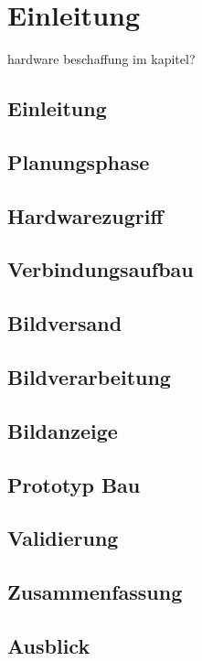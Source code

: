 \chapter{Einleitung}
hardware beschaffung im kapitel?
\section{Einleitung}
\section{Planungsphase}
\section{Hardwarezugriff}
\section{Verbindungsaufbau}
\section{Bildversand}
\section{Bildverarbeitung}
\section{Bildanzeige}
\section{Prototyp Bau}
\section{Validierung}
\section{Zusammenfassung}
\section{Ausblick}